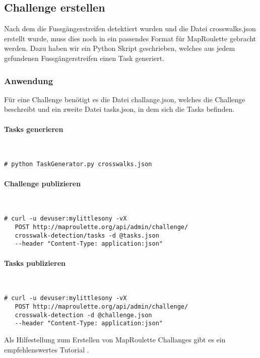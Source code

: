 \subsection{Challenge erstellen}
Nach dem die Fussgängerstreifen detektiert wurden und die Datei crosswalks.json erstellt wurde, muss dies noch in ein passendes Format für MapRoulette gebracht werden. Dazu haben wir ein Python Skript geschrieben, welches aus jedem gefundenen Fussgängerstreifen einen Task generiert.

\subsubsection{Anwendung}
Für eine Challenge benötigt es die Datei challange.json, welches die Challenge beschreibt und ein zweite Datei tasks.json, in dem sich die Tasks befinden.\\

\paragraph{Tasks generieren}\mbox{}\\
\begin{lstlisting}[style=BashInputStyle]
 # python TaskGenerator.py crosswalks.json
\end{lstlisting}

\paragraph{Challenge publizieren}\mbox{}\\
\begin{lstlisting}[style=BashInputStyle]
 # curl -u devuser:mylittlesony -vX 
   POST http://maproulette.org/api/admin/challenge/
   crosswalk-detection/tasks -d @tasks.json 
   --header "Content-Type: application:json"
\end{lstlisting}

\paragraph{Tasks publizieren}\mbox{}\\
\begin{lstlisting}[style=BashInputStyle]
 # curl -u devuser:mylittlesony -vX 
   POST http://maproulette.org/api/admin/challenge/
   crosswalk-detection -d @challenge.json 
   --header "Content-Type: application:json"
\end{lstlisting}


Als Hilfestellung zum Erstellen von MapRoulette Challanges gibt es ein empfehlenswertes Tutorial \cite{Tutorial}.

